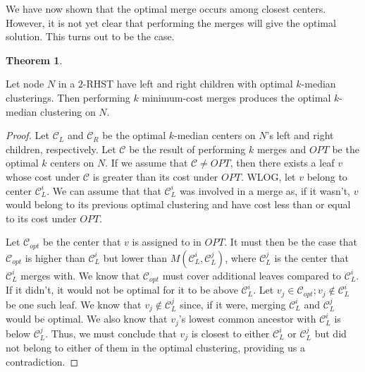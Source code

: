 \documentclass{article}
\theoremstyle{definition}
\newtheorem{theorem}{Theorem}
\begin{document}
We have now shown that the optimal merge occurs among closest centers. However, it is not yet clear that performing the merges will give the optimal
solution. This turns out to be the case.

\begin{theorem}
    \label{optimality-preservation}

    Let node $N$ in a $2$-RHST have left and right children with optimal $k$-median clusterings. Then performing $k$ minimum-cost merges produces the optimal
    $k$-median clustering on $N$.

\end{theorem}
\begin{proof}

    Let $\mathcal{C}_L$ and $\mathcal{C}_R$ be the optimal $k$-median centers on $N$'s left and right children, respectively. Let $\mathcal{C}$ be the result of
    performing $k$ merges and $OPT$ be the optimal $k$ centers on $N$. If we assume that $\mathcal{C} \neq OPT$, then there exists a leaf $v$ whose cost under
    $\mathcal{C}$ is greater than its cost under $OPT$. WLOG, let $v$ belong to center $\mathcal{C}_L^i$. We can assume that that $\mathcal{C}_L^i$ was involved
    in a merge as, if it wasn't, $v$ would belong to its previous optimal clustering and have cost less than or equal to its cost under $OPT$.

    Let $\mathcal{C}_{opt}$ be the center that $v$ is assigned to in $OPT$. It must then be the case that $\mathcal{C}_{opt}$ is higher than
    $\mathcal{C}_L^i$ but lower than $M(\mathcal{C}_L^i, \mathcal{C}_L^j)$, where $\mathcal{C}_L^j$ is the center that $\mathcal{C}_L^i$ merges with.  We
    know that $\mathcal{C}_{opt}$ must cover additional leaves compared to $\mathcal{C}_L^i$. If it didn't, it would not be optimal for it to be above
    $\mathcal{C}_L^i$. Let $v_j \in \mathcal{C}_{opt} ; v_j \notin \mathcal{C}_L^i$ be one such leaf. We know that $v_j \notin \mathcal{C}_L^j$ since, if it
    were, merging $\mathcal{C}_L^i$ and $\mathcal{C}_L^j$ would be optimal. We also know that $v_j$'s lowest common ancestor with $\mathcal{C}_L^i$ is
    below $\mathcal{C}_L^j$. Thus, we must conclude that $v_j$ is closest to either $\mathcal{C}_L^i$ or $\mathcal{C}_L^j$ but did not belong to either of
    them in the optimal clustering, providing us a contradiction.

\end{proof}
\end{document}
